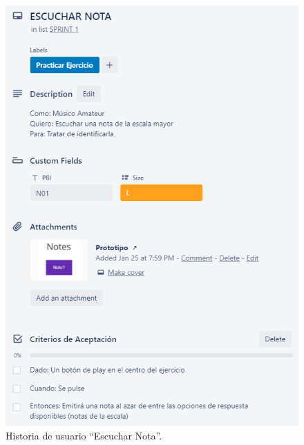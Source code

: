 \documentclass[12pt,twoside,titlepage]{report}
\begin{document}
\begin{figure}[H]
    \centering
    \includegraphics[scale=1.3]{Scrum/User Stories/Notas}
    \caption{Historia de usuario ``Escuchar Nota''.}
    \label{fig:Notas}
\end{figure}
\end{document}
